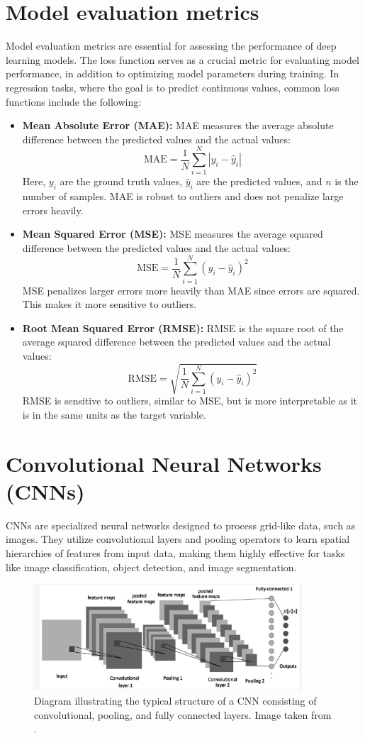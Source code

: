 \section{Model evaluation metrics}
Model evaluation metrics are essential for assessing the performance of deep learning models. The loss function serves as a crucial metric for evaluating model performance, in addition to optimizing model parameters during training. In regression tasks, where the goal is to predict continuous values, common loss functions include the following:
\begin{itemize}
\item \textbf{Mean Absolute Error (MAE):} MAE measures the average absolute difference between the predicted values and the actual values:\[ \text{MAE} = \frac{1}{N} \sum_{i=1}^{N} |y_i - \hat{y}_i| \] Here, $y_i$ are the ground truth values, $\hat{y}_i$ are the predicted values, and $n$ is the number of samples. MAE is robust to outliers and does not penalize large errors heavily.
\item \textbf{Mean Squared Error (MSE):} MSE measures the average squared difference between the predicted values and the actual values:\[ \text{MSE} = \frac{1}{N} \sum_{i=1}^{N} (y_i - \hat{y}_i)^2 \] MSE penalizes larger errors more heavily than MAE since errors are squared. This makes it more sensitive to outliers. 
\item \textbf{Root Mean Squared Error (RMSE):} RMSE is the square root of the average squared difference between the predicted values and the actual values: \[ \text{RMSE} = \sqrt{\frac{1}{N} \sum_{i=1}^{N} (y_i - \hat{y}_i)^2} \]RMSE is sensitive to outliers, similar to MSE, but is more interpretable as it is in the same units as the target variable.
\end{itemize}
\section{Convolutional Neural Networks (CNNs)} \label{cnnse}
CNNs \cite{lecun1998} are specialized neural networks designed to process grid-like data, such as images. They utilize convolutional layers and pooling operators to learn spatial hierarchies of features from input data, making them highly effective for tasks like image classification, object detection, and image segmentation.
\begin{figure}[ht]
    \centering
    \includegraphics[width=10cm]{images/Theory-DL/CNN.png}
    \caption{Diagram illustrating the typical structure of a CNN consisting of convolutional, pooling, and fully connected layers. Image taken from \cite{cnnimage}.}
    \label{fig:CNN}
  \end{figure}
